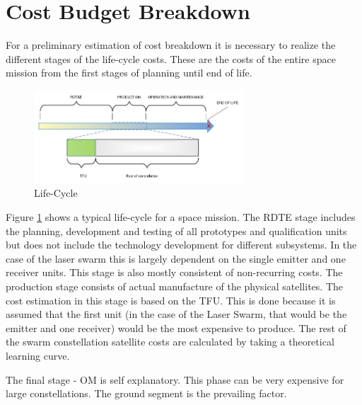 \section{Cost Budget Breakdown}
\label{blBudgetCost}
For a preliminary estimation of cost breakdown it is necessary to realize the different stages of the life-cycle costs. These are the costs of the entire space mission from the first stages of planning until end of life.
%

\begin{figure}[b]
\begin{center}

\includegraphics[width=0.7\textwidth]{chapters/img/lifetime.jpg}
\caption{Life-Cycle}
\label{fig:lifecycle}
\end{center}
\end{figure}

Figure \ref{fig:lifecycle} shows a typical life-cycle for a space mission. The \ac{RDTE} stage includes the planning, development and testing of all prototypes and qualification units but does not include the technology development for different subsystems. In the case of the laser swarm this is largely dependent on the single emitter and one receiver units. This stage is also mostly consistent of non-recurring costs. The production stage consists of actual manufacture of the physical satellites. The cost estimation in this stage is based on the \ac{TFU}. This is done because it is assumed that the first unit (in the case of the Laser Swarm, that would be the emitter and one receiver) would be the most expensive to produce. The rest of the swarm constellation satellite costs are calculated by taking a theoretical learning curve\cite{larson}. 

The final stage - \ac{OM} is self explanatory. This phase can be very expensive for large constellations. The ground segment is the prevailing factor.

